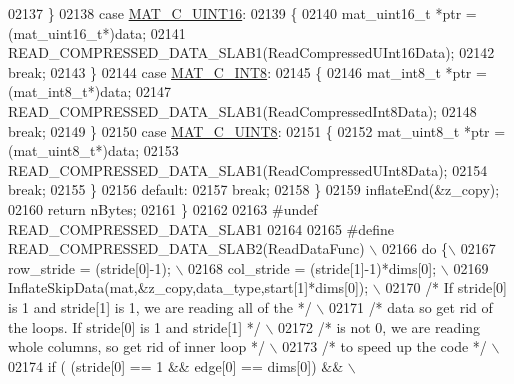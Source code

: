 \begin{DoxyCode}
{{{{{{{{{02137         \}
02138         \textcolor{keywordflow}{case} \hyperlink{group___m_a_t_ggad4d60ae7b709fc81bfd744fb4c857c40a8bede21dbf6c1edc0bbccc1481bccae7}{MAT\_C\_UINT16}:
02139         \{
02140             mat\_uint16\_t *ptr = (mat\_uint16\_t*)data;
02141             READ\_COMPRESSED\_DATA\_SLAB1(ReadCompressedUInt16Data);
02142             \textcolor{keywordflow}{break};
02143         \}
02144         \textcolor{keywordflow}{case} \hyperlink{group___m_a_t_ggad4d60ae7b709fc81bfd744fb4c857c40a984ff310f9e906100fcff95f704f43c5}{MAT\_C\_INT8}:
02145         \{
02146             mat\_int8\_t *ptr = (mat\_int8\_t*)data;
02147             READ\_COMPRESSED\_DATA\_SLAB1(ReadCompressedInt8Data);
02148             \textcolor{keywordflow}{break};
02149         \}
02150         \textcolor{keywordflow}{case} \hyperlink{group___m_a_t_ggad4d60ae7b709fc81bfd744fb4c857c40a81270f8093cb4808e992c1d29d84d4e3}{MAT\_C\_UINT8}:
02151         \{
02152             mat\_uint8\_t *ptr = (mat\_uint8\_t*)data;
02153             READ\_COMPRESSED\_DATA\_SLAB1(ReadCompressedUInt8Data);
02154             \textcolor{keywordflow}{break};
02155         \}
02156         \textcolor{keywordflow}{default}:
02157             \textcolor{keywordflow}{break};
02158     \}
02159     inflateEnd(&z\_copy);
02160     \textcolor{keywordflow}{return} nBytes;
02161 \}
02162 
02163 \textcolor{preprocessor}{#undef READ\_COMPRESSED\_DATA\_SLAB1}
02164 
02165 \textcolor{preprocessor}{#define READ\_COMPRESSED\_DATA\_SLAB2(ReadDataFunc) \(\backslash\)}
02166 \textcolor{preprocessor}{    do \{\(\backslash\)}
02167 \textcolor{preprocessor}{        row\_stride = (stride[0]-1); \(\backslash\)}
02168 \textcolor{preprocessor}{        col\_stride = (stride[1]-1)*dims[0]; \(\backslash\)}
02169 \textcolor{preprocessor}{        InflateSkipData(mat,&z\_copy,data\_type,start[1]*dims[0]); \(\backslash\)}
02170 \textcolor{preprocessor}{        }\textcolor{comment}{/* If stride[0] is 1 and stride[1] is 1, we are reading all of the */}\textcolor{preprocessor}{ \(\backslash\)}
02171 \textcolor{preprocessor}{        }\textcolor{comment}{/* data so get rid of the loops.  If stride[0] is 1 and stride[1] */}\textcolor{preprocessor}{ \(\backslash\)}
02172 \textcolor{preprocessor}{        }\textcolor{comment}{/* is not 0, we are reading whole columns, so get rid of inner loop */}\textcolor{preprocessor}{ \(\backslash\)}
02173 \textcolor{preprocessor}{        }\textcolor{comment}{/* to speed up the code */}\textcolor{preprocessor}{ \(\backslash\)}
02174 \textcolor{preprocessor}{        if ( (stride[0] == 1 && edge[0] == dims[0]) && \(\backslash\)}
}}}}}}}}}
\end{DoxyCode}
